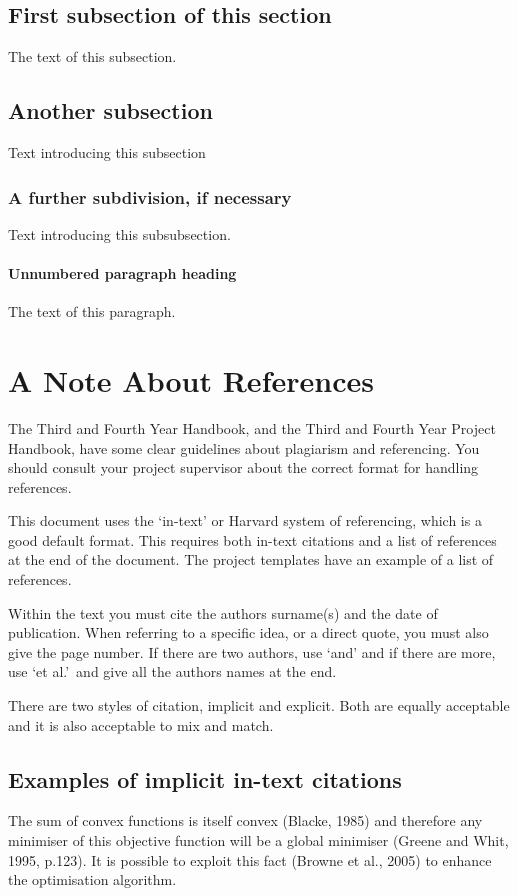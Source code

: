 \documentclass[a4paper, 12pt, notitlepage]{report}
\begin{document}
	\subsection{First subsection of this section}
	The text of this subsection.
	
	\subsection{Another subsection}
	Text introducing this subsection
	
	\subsubsection{A further subdivision, if necessary}
	Text introducing this subsubsection.
	
	\paragraph{Unnumbered paragraph heading}
	The text of this paragraph.
	
	\section{A Note About References}
	The Third and Fourth Year Handbook, and the Third and Fourth Year Project Handbook, have some clear guidelines about plagiarism and referencing.
	You should consult your project supervisor about the correct format for handling references.
	
	This document uses the `in-text' or Harvard system of referencing, which is a good default format.
	This requires both in-text citations and a list of references at the end of the document.
	The project templates have an example of a list of references.
	
	Within the text you must cite the authors surname(s) and the date of publication.
	When referring to a specific idea, or a direct quote, you must also give the page number.
	If there are two authors, use `and' and if there are more, use `et al.'\ and give all the authors names at the end.
	
	There are two styles of citation, implicit and explicit.
	Both are equally acceptable and it is also acceptable to mix and match.
	
	\subsection{Examples of implicit in-text citations}
	The sum of convex functions is itself convex (Blacke, 1985) and therefore any minimiser of this objective function will be a global minimiser (Greene and Whit, 1995, p.123). It is possible to exploit this fact (Browne et al., 2005) to enhance the optimisation algorithm.
	
\end{document}
